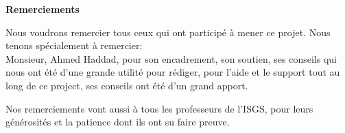 \begin{center}
	\LARGE\textbf{Remerciements}
\end{center}
\vspace{0.5cm}
\large
\noindent
Nous voudrons remercier tous ceux qui ont participé à mener ce projet. Nous tenons spécialement à remercier: \\

\noindent
Monsieur, Ahmed Haddad, pour son encadrement, son soutien, ses conseils qui nous ont été d'une grande utilité pour rédiger, pour l'aide et le support tout au long de ce project, ses conseils ont été d'un grand apport.

\vspace{0.5cm}
\noindent
Nos remerciements vont aussi à tous les professeurs de l'ISGS, pour leurs générosités et la patience dont ils ont su faire preuve.

\newpage